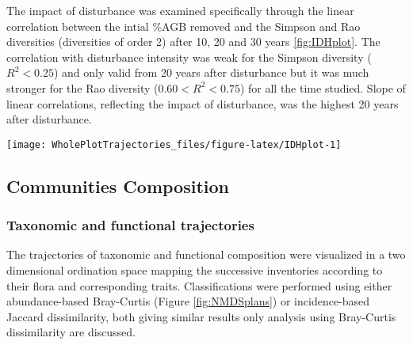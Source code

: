 \documentclass[fleqn,10pt]{ArtEcoFoG} %
\theoremstyle{definition}
\theoremstyle{definition}
\theoremstyle{definition}
\theoremstyle{remark}
\begin{document}
The impact of disturbance was examined specifically through the linear
correlation between the intial \%AGB removed and the Simpson and Rao
diversities (diversities of order 2) after 10, 20 and 30 years
\ref{fig:IDHplot}. The correlation with disturbance intensity was weak
for the Simpson diversity (\(R^2<0.25\)) and only valid from 20 years
after disturbance but it was much stronger for the Rao diversity
(\(0.60<R^2<0.75\)) for all the time studied. Slope of linear
correlations, reflecting the impact of disturbance, was the highest 20
years after disturbance.

\begin{figure*}

{\centering \texttt{[image: WholePlotTrajectories\_files/figure-latex/IDHplot-1]} 

}

\caption{Upper panels, Trajectories of the Simpson taxonomic diversity \textbf{(a)} and Rao functional diversity \textbf{(b)} over 30 years after disturbance, corresponding to the median and 0.025 and 0.975 percentile observed after 50 iteration of the taxonomic uncertainty propagation and the missing trait value filling processes. Initial treatments are represented by solid lines colors with green for control, blue for T1,orange for T2 and red for T3. Lower panels, Relationship between the initial \%AGB removed and the median values of Simpson \textbf{(c)} and Rao \textbf{(d)} diversities at three times after disturbance. Solid lines colors represent the time, 10 years (yellow), 20 years (orange) and 30 years (brown) after disturbance.}\label{fig:IDHplot}
\end{figure*}

\subsection{Communities Composition}\label{communities-composition}

\subsubsection{Taxonomic and functional
trajectories}\label{taxonomic-and-functional-trajectories}

The trajectories of taxonomic and functional composition were visualized
in a two dimensional ordination space mapping the successive inventories
according to their flora and corresponding traits. Classifications were
performed using either abundance-based Bray-Curtis (Figure
\ref{fig:NMDSplans}) or incidence-based Jaccard dissimilarity, both
giving similar results only analysis using Bray-Curtis dissimilarity are
discussed.
\end{document}

